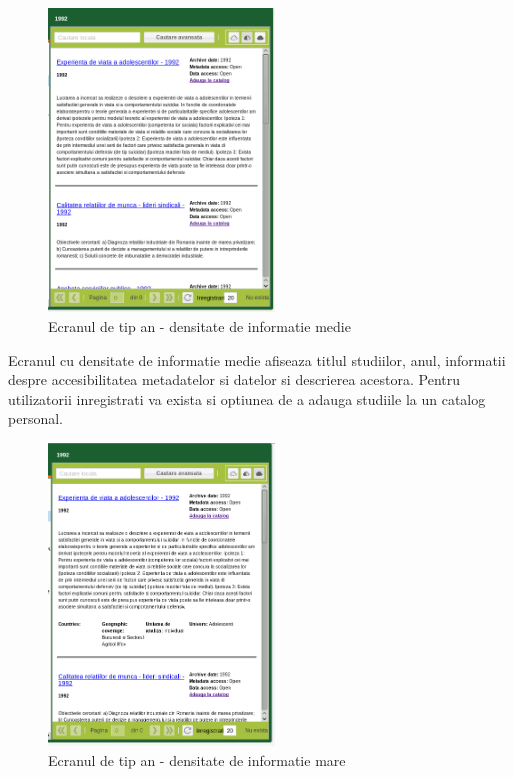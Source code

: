 \begin{figure}[H]
\begin{centering}
\includegraphics[width=6cm]{screenshots/details-panel-an-medium}
\par\end{centering}
\caption{Ecranul de tip an - densitate de informatie medie}
\end{figure}

Ecranul cu densitate de informatie medie afiseaza titlul studiilor,
anul, informatii despre accesibilitatea metadatelor si datelor si
descrierea acestora. Pentru utilizatorii inregistrati va exista si
optiunea de a adauga studiile la un catalog personal. 

\begin{figure}[H]
\begin{centering}
\includegraphics[width=6cm]{screenshots/details-panel-an-large}
\par\end{centering}
\caption{Ecranul de tip an - densitate de informatie mare}
\end{figure}

